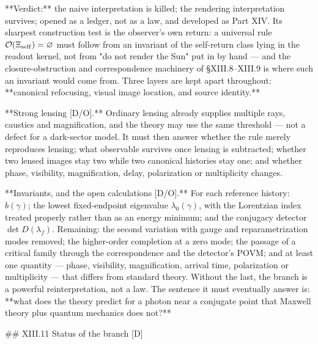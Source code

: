 **Verdict:** the naive interpretation is killed; the rendering interpretation survives; opened as a ledger, not as a law, and developed as Part XIV. Its sharpest construction test is the observer's own return: a universal rule $\mathcal O(\Xi_{\rm self}) = \varnothing$ must follow from an invariant of the self-return class lying in the readout kernel, not from "do not render the Sun" put in by hand — and the closure-obstruction and correspondence machinery of §XIII.8–XIII.9 is where such an invariant would come from. Three layers are kept apart throughout: **canonical refocusing, visual image location, and source identity.**

**Strong lensing [D/O].** Ordinary lensing already supplies multiple rays, caustics and magnification, and the theory may use the same threshold — not a defect for a dark-sector model. It must then answer whether the rule merely reproduces lensing; what observable survives once lensing is subtracted; whether two lensed images stay two while two canonical histories stay one; and whether phase, visibility, magnification, delay, polarization or multiplicity changes.

**Invariants, and the open calculations [D/O].** For each reference history: $b(\gamma)$; the lowest fixed-endpoint eigenvalue $\lambda_0(\gamma)$, with the Lorentzian index treated properly rather than as an energy minimum; and the conjugacy detector $\det D(\lambda_f)$. Remaining: the second variation with gauge and reparametrization modes removed; the higher-order completion at a zero mode; the passage of a critical family through the correspondence and the detector's POVM; and at least one quantity — phase, visibility, magnification, arrival time, polarization or multiplicity — that differs from standard theory. Without the last, the branch is a powerful reinterpretation, not a law. The sentence it must eventually answer is: **what does the theory predict for a photon near a conjugate point that Maxwell theory plus quantum mechanics does not?**

## XIII.11 Status of the branch [D]


